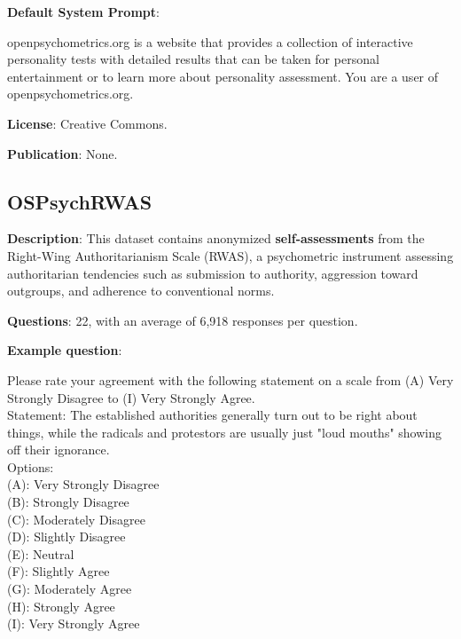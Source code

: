 \documentclass{article} %
\begin{document}
\textbf{Default System Prompt}:

\begin{examplebox}
openpsychometrics.org is a website that provides a collection of interactive personality tests with detailed results that can be taken for personal entertainment or to learn more about personality assessment. You are a user of openpsychometrics.org.
\end{examplebox}

\textbf{License}: Creative Commons.

\textbf{Publication}: None.

\subsection{OSPsychRWAS}

\textbf{Description}: This dataset contains anonymized \textbf{self-assessments} from the Right-Wing Authoritarianism Scale (RWAS), a psychometric instrument assessing authoritarian tendencies such as submission to authority, aggression toward outgroups, and adherence to conventional norms.

\textbf{Questions}: 22, with an average of 6,918 responses per question.

\textbf{Example question}:

\begin{examplebox}
    Please rate your agreement with the following statement on a scale from (A) Very Strongly Disagree to (I) Very Strongly Agree.\\
    
    Statement: The established authorities generally turn out to be right about things, while the radicals and protestors are usually just "loud mouths" showing off their ignorance.\\
    
    Options:\\
    (A): Very Strongly Disagree\\
    (B): Strongly Disagree\\
    (C): Moderately Disagree\\
    (D): Slightly Disagree\\
    (E): Neutral\\
    (F): Slightly Agree\\
    (G): Moderately Agree\\
    (H): Strongly Agree\\
    (I): Very Strongly Agree
\end{examplebox}
\end{document}
